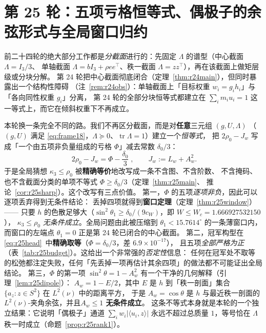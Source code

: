 \documentclass[UTF8,11pt]{ctexart}
\theoremstyle{definition}
\newcommand{\Lam}{\Lambda}
\newcommand{\tr}{\operatorname{tr}}
\begin{document}
\section{第 25 轮：五项亏格恒等式、偶极子的余弦形式与全局窗口归约}\label{sec:r25}

前二十四轮的绝大部分工作都是\emph{分截面}进行的：先固定 $\Lam$ 的谱型（中心截面 $\Lam=I_3/3$、
单轴截面 $\Lam=bI_3+\rho ee^\top$、秩一截面 $\Lam=zz^\top$），再在该截面上做矩层级或分块分解。
第 24 轮把中心截面彻底闭合（定理~\ref{thm:r24main}），但同时暴露出一个结构性障碍
（注~\ref{rem:r24obs}）：单轴截面上「目标权重 $w_i=g_ih_i$」与「各向同性权重 $g_i$」分离，
第 24 轮的全部分块恒等式都建立在 $\sum_im_iu_i=1$ 这一等式上，而它在倾斜权重下不再成立。

本轮换一条完全不同的路。我们不再区分截面，而是对\textbf{任意}三元组 $(g,U,\Lam)$
（$(g,U)$ 满足 \eqref{eq:frame18}，$\Lam\succeq0$、$\tr\Lam=1$）建立一个\emph{恒等式}，
把 $2\rho_0-J_w$ 写成「一个由五项非负量组成的亏格 $\Phi$」减去常数 $\delta_0/3$：
\begin{equation}\label{eq:r25head}
\boxed{\;2\rho_0-J_w=\Phi-\frac{\delta_0}{3}\;},\qquad
J_w:=L_w+A_w^2 .
\end{equation}
于是全局猜想 $\kappa_3\le\rho_0$ 被\textbf{精确等价}地改写成一条不含图、不含阶数、
不含掩码、也不含截面分类的单项不等式 $\Phi\ge\delta_0/3$（定理~\ref{thm:r25main}、
推论~\ref{cor:r25sharp}）。这个改写有三点价值。
第一，$\Phi$ 的五项\emph{逐项非负}，因此可以逐项丢弃得到无条件结论：
丢掉四项就得到\textbf{窗口定理}（定理~\ref{thm:r25window}）——
只要 $h$ 的色散足够大（$\sin^2\theta_1\ge\delta_0/(9c_W)$，即 $W\le W_c=1.666927532150$），
$\kappa_3\le\rho_0$ \emph{无条件成立}。全局问题由此被压缩到
$\theta_1<15.7614^\circ$ 的一条薄窗口内，而窗口的左端点 $\theta_1=0$ 正是第 24 轮已闭合的中心截面。
第二，冠军构型在 \eqref{eq:r25head}~中\textbf{精确取等}（$\Phi=\delta_0/3$，差 $6.9\times10^{-17}$），
且五项\emph{全部严格为正}（表~\ref{tab:r25budget}）。这给出一个非常强的\emph{否定性}信息：
任何在冠军处不取等的松弛都注定失败，任何「先丢掉一项再估计其余四项」的做法都不可能证出全局结论。
第三，$\Phi$ 的第一项 $\sin^2\theta=1-A_w^2$ 有一个干净的几何解释（引理~\ref{lem:r25dipole}）：
$A_w=1-E/2$，其中 $E$ 是 $h$ 到「秩一剖面」集合 $\{a_z:z\in S^2\}$ 在 $L^2(\nu)$ 中的距离平方，
于是 $A_w=\cos\theta$ 是 $h$ 与最近秩一剖面的 $L^2(\nu)$-夹角余弦，并且\textbf{$A_w\le1$ 无条件成立}。
这条不等式本身就是本轮的一个独立结果：它说明「偶极子」通道
$\sum_iw_i|\langle u_i,z\rangle|$ 永远不超过总质量 $1$，等号恰在 $\Lam$ 秩一时成立（命题~\ref{prop:r25rank1}）。
\end{document}
